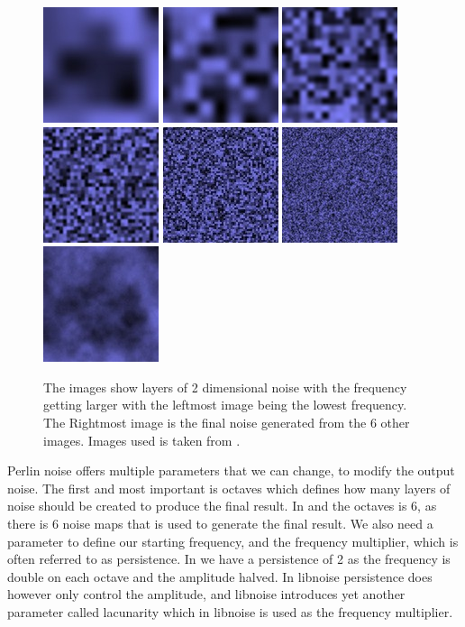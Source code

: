 \begin{figure}[H]
	\includegraphics[width=0.135\linewidth]{img/perlin_a}
	\includegraphics[width=0.135\linewidth]{img/perlin_b}
	\includegraphics[width=0.135\linewidth]{img/perlin_c}
	\includegraphics[width=0.135\linewidth]{img/perlin_d}
	\includegraphics[width=0.135\linewidth]{img/perlin_e}
	\includegraphics[width=0.135\linewidth]{img/perlin_f}
	\includegraphics[width=0.135\linewidth]{img/p_128}
	\centering
	\caption{The images show layers of 2 dimensional noise with the frequency getting larger with the leftmost image being the lowest frequency. The Rightmost image is the final noise generated from the 6 other images. Images used is taken from \cite{perlinnoise2}.}
	\label{fig:2DNoise}
\end{figure}

Perlin noise offers multiple parameters that we can change, to modify the output noise. The first and most important is octaves which defines how many layers of noise should be created to produce the final result. In  and  the octaves is 6, as there is 6 noise maps that is used to generate the final result. We also need a parameter to define our starting frequency, and the frequency multiplier, which is often referred to as persistence. In  we have a persistence of 2 as the frequency is double on each octave and the amplitude halved. In libnoise persistence does however only control the amplitude, and libnoise introduces yet another parameter called lacunarity which in libnoise is used as the frequency multiplier\cite{libnoisePerlin}.


